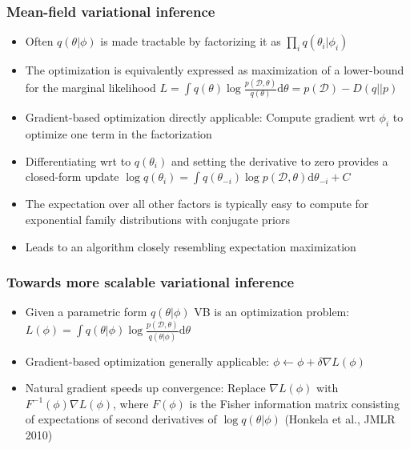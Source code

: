 \documentclass{beamer}
\newcommand{\dataset}{\mathcal{D}}
\newcommand{\parameters}{\theta}
\newcommand{\vparameters}{\phi}
\newcommand{\diff}{\mathrm{d}}
\begin{document}
\begin{frame}
  \frametitle{Mean-field variational inference}

  \begin{itemize}
    \item Often $q(\parameters|\vparameters)$ is made tractable by
      factorizing it as $\prod_i q(\parameters_i|\vparameters_i)$
    \item The optimization is equivalently expressed as maximization of a lower-bound for the marginal likelihood
      $L = \int q(\parameters) \log \frac{p(\dataset,\parameters)}{q(\parameters)} \diff \parameters= p(\dataset) - D(q||p)$
    \item Gradient-based optimization directly applicable:
      Compute gradient wrt $\vparameters_i$ to optimize one term
      in the factorization

    \item Differentiating wrt to $q(\parameters_i)$ and setting the derivative to zero provides a closed-form
      update $\log q(\parameters_i) = \int q(\parameters_{-i}) \log p(\dataset, \parameters) \diff \parameters_{-i} + C$
    \item The expectation over all other factors is typically easy to compute
      for exponential
      family distributions with conjugate priors
    \item Leads to an algorithm closely resembling expectation maximization
  \end{itemize}
\end{frame}


\begin{frame}
  \frametitle{Towards more scalable variational inference}

  \begin{itemize}
  \item Given a parametric form $q(\parameters|\vparameters)$ VB is an optimization problem:
  $L(\vparameters) = \int q(\parameters|\vparameters) \log \frac{p(\dataset,\parameters)}{q(\parameters|\vparameters)} \diff \parameters$
  \item Gradient-based optimization generally applicable: $\vparameters \leftarrow \vparameters + \delta
    \nabla L(\vparameters)$
  \item Natural gradient speeds up convergence: Replace $\nabla L(\vparameters)$ with $F^{-1}(\vparameters)
\nabla L(\vparameters)$, where $F(\vparameters)$ is the Fisher information matrix
  consisting of expectations of second derivatives of $\log q(\parameters | \vparameters)$
 (Honkela et al., JMLR 2010)
  \end{itemize}
\end{frame}
\end{document}
